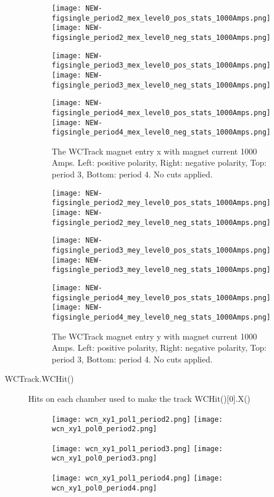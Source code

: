 \begin{description}
{     \begin{figure}[h]	      
        	\texttt{[image: NEW-figsingle\_period2\_mex\_level0\_pos\_stats\_1000Amps.png]}
	 \texttt{[image: NEW-figsingle\_period2\_mex\_level0\_neg\_stats\_1000Amps.png]}
	 
   	\texttt{[image: NEW-figsingle\_period3\_mex\_level0\_pos\_stats\_1000Amps.png]}
	 \texttt{[image: NEW-figsingle\_period3\_mex\_level0\_neg\_stats\_1000Amps.png]}
	 
 	\texttt{[image: NEW-figsingle\_period4\_mex\_level0\_pos\_stats\_1000Amps.png]}
	 \texttt{[image: NEW-figsingle\_period4\_mex\_level0\_neg\_stats\_1000Amps.png]}
   \caption[short]{The WCTrack magnet entry x with magnet current 1000 Amps. Left: positive polarity, Right: negative polarity, Top: period 3, Bottom: period 4. No cuts applied.}
   \label{fig_mex}
  \end{figure}
  
       \begin{figure}[h]	   
        	\texttt{[image: NEW-figsingle\_period2\_mey\_level0\_pos\_stats\_1000Amps.png]}
	 \texttt{[image: NEW-figsingle\_period2\_mey\_level0\_neg\_stats\_1000Amps.png]}
	 
   	\texttt{[image: NEW-figsingle\_period3\_mey\_level0\_pos\_stats\_1000Amps.png]}
	 \texttt{[image: NEW-figsingle\_period3\_mey\_level0\_neg\_stats\_1000Amps.png]}
	 
 	\texttt{[image: NEW-figsingle\_period4\_mey\_level0\_pos\_stats\_1000Amps.png]}
	 \texttt{[image: NEW-figsingle\_period4\_mey\_level0\_neg\_stats\_1000Amps.png]}
   \caption[short]{The WCTrack magnet entry y with magnet current 1000 Amps. Left: positive polarity, Right: negative polarity, Top: period 3, Bottom: period 4. No cuts applied.}
   \label{fig_mey}
  \end{figure}
  
  
}
\item[WCTrack.WCHit()]{
Hits on each chamber used to make the track  WCHit()[0].X()

       \begin{figure}[h]	   
        	\texttt{[image: wcn\_xy1\_pol1\_period2.png]}
	 \texttt{[image: wcn\_xy1\_pol0\_period2.png]}
	 
        	\texttt{[image: wcn\_xy1\_pol1\_period3.png]}
	 \texttt{[image: wcn\_xy1\_pol0\_period3.png]}
	 
	 \texttt{[image: wcn\_xy1\_pol1\_period4.png]}
	 \texttt{[image: wcn\_xy1\_pol0\_period4.png]}
	 

\end{figure}}
\end{description}
